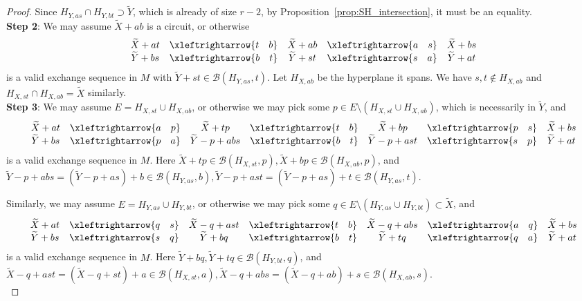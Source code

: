 \documentclass{amsart}
\newcommand{\swap}[2]{\xleftrightarrow{#1 \quad #2}}
\newcommand\Bcal{{\mathcal B}}
\begin{document}
\begin{proof}
    Since $H_{Y,as}\cap H_{Y,bt}\supset\widetilde{Y}$, which is already of size $r-2$, by Proposition~\ref{prop:SH_intersection}, it must be an equality.\\

    {\bf Step 2}: We may assume $\widetilde{X}+ab$ is a circuit, or otherwise
    $$
    \begin{array}{c c c c c}
        \widetilde{X}+at   & \swap{t}{b} & \widetilde{X}+ab & \swap{a}{s} & \widetilde{X}+bs\\
        \widetilde{Y}+bs   & \swap{b}{t} & \widetilde{Y}+st & \swap{s}{a} & \widetilde{Y}+at
    \end{array}
    $$
    is a valid exchange sequence in $M$ with $\widetilde{Y}+st\in\Bcal(H_{Y,as}, t)$. Let $H_{X,ab}$ be the hyperplane it spans. We have $s,t\not\in H_{X,ab}$ and $H_{X,st}\cap H_{X,ab}=\widetilde{X}$ similarly.\\

    {\bf Step 3}: We may assume $E=H_{X,st}\cup H_{X,ab}$, or otherwise we may pick some $p\in E\setminus (H_{X,st}\cup H_{X,ab})$, which is necessarily in $\widetilde{Y}$, and
    $$
    \begin{array}{c c c c c c c}
        \widetilde{X}+at   & \swap{a}{p} & \widetilde{X}+tp & \swap{t}{b} & \widetilde{X}+bp & \swap{p}{s} & \widetilde{X}+bs\\
        \widetilde{Y}+bs   & \swap{p}{a} & \widetilde{Y}-p+abs & \swap{b}{t} & \widetilde{Y}-p+ast & \swap{s}{p} & \widetilde{Y}+at
    \end{array}
    $$
    is a valid exchange sequence in $M$. Here $\widetilde{X}+tp\in\Bcal(H_{X,st},p), \widetilde{X}+bp\in\Bcal(H_{X,ab},p)$, and $\widetilde{Y}-p+abs=(\widetilde{Y}-p+as)+b\in\Bcal(H_{Y,as},b), \widetilde{Y}-p+ast=(\widetilde{Y}-p+as)+t\in\Bcal(H_{Y,as},t)$.

    Similarly, we may assume $E=H_{Y,as}\cup H_{Y,bt}$, or otherwise we may pick some $q\in E\setminus (H_{Y,as}\cup H_{Y,bt})\subset\widetilde{X}$, and
    $$
    \begin{array}{c c c c c c c}
        \widetilde{X}+at   & \swap{q}{s} & \widetilde{X}-q+ast & \swap{t}{b} & \widetilde{X}-q+abs & \swap{a}{q} & \widetilde{X}+bs\\
        \widetilde{Y}+bs   & \swap{s}{q} & \widetilde{Y}+bq & \swap{b}{t} & \widetilde{Y}+tq & \swap{q}{a} & \widetilde{Y}+at
    \end{array}
    $$
    is a valid exchange sequence in $M$. Here $\widetilde{Y}+bq, \widetilde{Y}+tq\in\Bcal(H_{Y,bt},q)$, and $\widetilde{X}-q+ast=(\widetilde{X}-q+st)+a\in\Bcal(H_{X,st},a), \widetilde{X}-q+abs=(\widetilde{X}-q+ab)+s\in\Bcal(H_{X,ab},s)$.\\


\end{proof}
\end{document}
